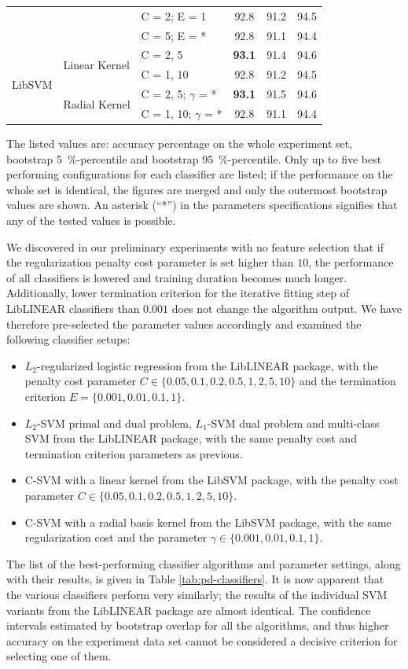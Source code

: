 \documentclass[12pt,notitlepage,a4paper]{report}
\begin{document}
\begin{table}[htbp]
\begin{center}
\begin{tabular}{|l|l|l|c|c|c|}
 &  & C = 2; E = 1 & 92.8 & 91.2 & 94.5 \\
 &  & C = 5; E = * & 92.8 & 91.1 & 94.4 \\\hline
 \multirow{4}{*}{LibSVM} & \multirow{2}{*}{Linear Kernel} & C = 2, 5 & \bf 93.1 & 91.4 & 94.6 \\
 &  & C = 1, 10 & 92.8 & 91.2 & 94.5 \\\cline{2-6}
 & \multirow{2}{*}{Radial Kernel} & C = 2, 5; $\gamma$ = * & \bf 93.1 & 91.5 & 94.6 \\
 &  & C = 1, 10; $\gamma$ = * & 92.8 & 91.1 & 94.4 \\\hline
\end{tabular}
\shorthandon{-}
\end{center}
The listed values are: accuracy percentage on the whole experiment set, bootstrap 5~\%-percentile and bootstrap 95~\%-percentile. Only up to five best performing configurations for each classifier are listed; if the performance on the whole set is identical, the figures are merged and only the outermost bootstrap values are shown. An asterisk (``*'') in the parameters specifications signifies that any of the tested values is possible.
\end{table}

We discovered in our preliminary experiments with no feature selection that if the regularization penalty cost parameter is set higher than $10$, the performance of all classifiers is lowered and training duration becomes much longer. Additionally, lower termination criterion for the iterative fitting step of LibLINEAR classifiers than $0.001$ does not change the algorithm output. We have therefore pre-selected the parameter values accordingly and examined the following classifier setups:
\begin{itemize}
    \item $L_2$-regularized logistic regression from the LibLINEAR package, with the penalty cost parameter $C\in\{0.05,0.1,0.2,0.5,1,2,5,10\}$ and the termination criterion $E=\{0.001, 0.01, 0.1, 1\}$.
    \item $L_2$-SVM primal and dual problem, $L_1$-SVM dual problem and multi-class SVM from the LibLINEAR package, with the same penalty cost and termination criterion parameters as previous.
    \item C-SVM with a linear kernel from the LibSVM package, with the penalty cost parameter $C\in\{0.05,0.1,0.2,0.5,1,2,5,10\}$.
    \item C-SVM with a radial basis kernel from the LibSVM package, with the same regularization cost and the parameter $\gamma\in\{0.001,0.01,0.1,1\}$.
\end{itemize}
The list of the best-performing classifier algorithms and parameter settings, along with their results, is given in Table \ref{tab:pd-classifiers}. It is now apparent that the various classifiers perform very similarly; the results of the individual SVM variants from the LibLINEAR package are almost identical. The confidence intervals estimated by bootstrap overlap for all the algorithms, and thus higher accuracy on the experiment data set cannot be considered a decisive criterion for selecting one of them.
\end{document}
